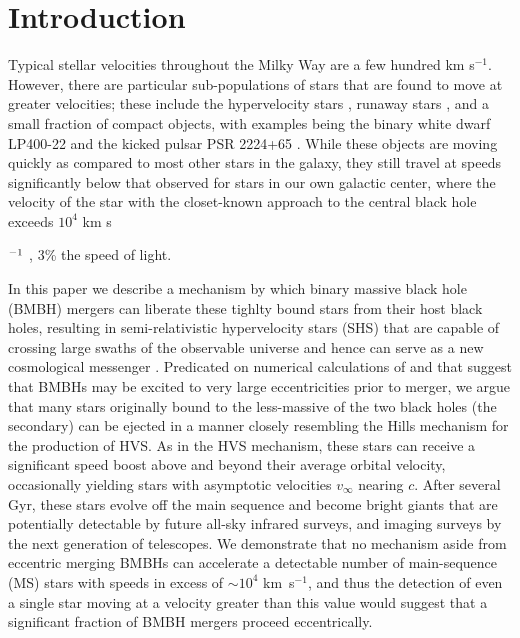 \documentclass[a4paper,twocolumn]{emulateapj}
\begin{document}
\section{Introduction}
Typical stellar velocities throughout the Milky Way are a few hundred km s$^{-1}$. However, there are particular sub-populations of stars that are found to move at greater velocities; these include the hypervelocity stars \citep[HVS; The fastest having $v \lesssim 700$ km~s$^{-1}$,][]{Brown:2005a,Brown:2011a,Brown:2014a}, runaway stars \citep[e.g.][]{Heber:2008a}, and a small fraction of compact objects, with examples being the binary white dwarf LP400-22 \citep[$v > 830$ km s$^{-1}$]{Kilic:2013a} and the kicked pulsar PSR 2224+65 \citep[$\approx 10^{3}$~km~s$^{-1}$,][]{Cordes:1993a}. While these objects are moving quickly as compared to most other stars in the galaxy, they still travel at speeds significantly below that observed for stars in our own galactic center, where the velocity of the star with the closet-known approach to the central black hole exceeds $10^{4}$ km s{$^{\smash{-1}}$ \citep{Ghez:2005a}, 3\% the speed of light.

In this paper we describe a mechanism by which binary massive black hole (BMBH) mergers can liberate these tighlty bound stars from their host black holes, resulting in semi-relativistic hypervelocity stars (SHS) that are capable of crossing large swaths of the observable universe and hence can serve as a new cosmological messenger \citep[see also][]{Loeb:2014a}. Predicated on numerical calculations of \citet{Sesana:2010a} and \citet{Iwasawa:2011a} that suggest that BMBHs may be excited to very large eccentricities prior to merger, we argue that many stars originally bound to the less-massive of the two black holes (the secondary) can be ejected in a manner closely resembling the Hills mechanism \citep{Hills:1988a} for the production of HVS. As in the HVS mechanism, these stars can receive a significant speed boost above and beyond their average orbital velocity, occasionally yielding stars with asymptotic velocities $v_{\infty}$ nearing $c$. After several Gyr, these stars evolve off the main sequence and become bright giants that are potentially detectable by future all-sky infrared surveys, and imaging surveys by the next generation of telescopes. We demonstrate that no mechanism aside from eccentric merging BMBHs can accelerate a detectable number of main-sequence (MS) stars with speeds in excess of $\sim 10^{4}$ km~s$^{-1}$, and thus the detection of even a single star moving at a velocity greater than this value would suggest that a significant fraction of BMBH mergers proceed eccentrically. 

}
\end{document}
